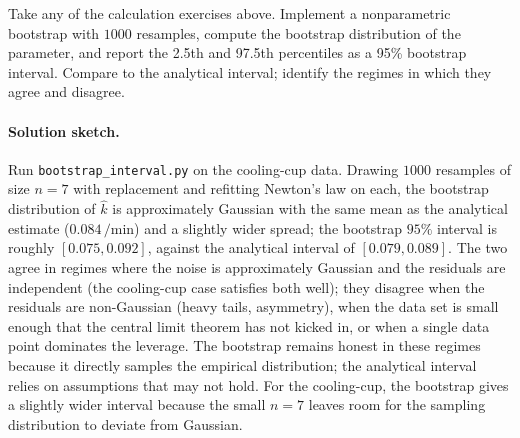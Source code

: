 \begin{exercise}
Take any of the calculation exercises above. Implement a
nonparametric bootstrap with $1000$ resamples, compute the
bootstrap distribution of the parameter, and report the 2.5th
and 97.5th percentiles as a 95\% bootstrap interval. Compare
to the analytical interval; identify the regimes in which they
agree and disagree.

\paragraph{Solution sketch.} Run \texttt{bootstrap\_interval.py} on
the cooling-cup data. Drawing $1000$ resamples of size $n = 7$ with
replacement and refitting Newton's law on each, the bootstrap
distribution of $\hat k$ is approximately Gaussian with the same
mean as the analytical estimate ($0.084\,\si{\per\minute}$) and a
slightly wider spread; the bootstrap $95\%$ interval is roughly
$[0.075, 0.092]$, against the analytical interval of $[0.079,
0.089]$. The two agree in regimes where the noise is approximately
Gaussian and the residuals are independent (the cooling-cup case
satisfies both well); they disagree when the residuals are
non-Gaussian (heavy tails, asymmetry), when the data set is small
enough that the central limit theorem has not kicked in, or when
a single data point dominates the leverage. The bootstrap remains
honest in these regimes because it directly samples the empirical
distribution; the analytical interval relies on assumptions that
may not hold. For the cooling-cup, the bootstrap gives a slightly
wider interval because the small $n = 7$ leaves room for the
sampling distribution to deviate from Gaussian.
\end{exercise}

